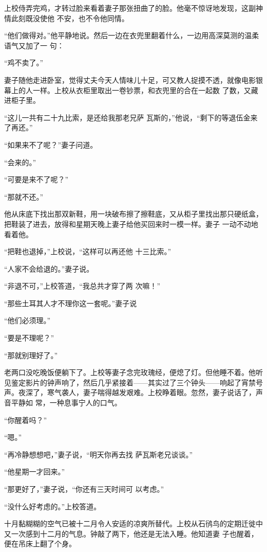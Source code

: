\documentclass{article}
\begin{document}
上校侍弄完鸡，才转过脸来看着妻子那张扭曲了的脸。他毫不惊讶地发现，这副神情此刻既没使他
不安，也不令他同情。 

“他们做得对。”他平静地说。然后一边在衣兜里翻着什么，一边用高深莫测的温柔语气又加了一
句： 


“鸡不卖了。” 

妻子随他走进卧室，觉得丈夫今天人情味儿十足，可又教人捉摸不透，就像电影银幕上的人一样。上校从衣柜里取出一卷钞票，和衣兜里的合在一起数
了数，又藏进柜子里。 

\newpage

“这儿一共有二十九比索，是还给我那老兄萨
瓦斯的，”他说，“剩下的等退伍金来了再还。” 


“如果来不了呢？”妻子问道。 


“会来的。” 


“可要是来不了呢？” 


“那就不还。” 

他从床底下找出那双新鞋，用一块破布擦了擦鞋底，又从柜子里找出那只硬纸盒，把鞋装了进去，放得和星期天晚上妻子给他买回来时一模一样。妻子
一动不动地看着他。 

“把鞋也退掉，”上校说，“这样可以再还他
十三比索。” 


“人家不会给退的。”妻子说。 

\newpage

“非退不可，”上校答道，“我总共才穿了两
次嘛！” 

“那些土耳其人才不理你这一套呢。”妻子说


“他们必须理。” 


“要是不理呢？” 


“那就别理好了。” 

老两口没吃晚饭便躺下了。上校等妻子念完玫瑰经，便熄了灯。但他睡不着。他听见鉴定影片的钟声响了，然后几乎紧接着——其实过了三个钟头——响起了宵禁号声。夜深了，寒气袭人，妻子喘得越发艰难。上校睁着眼。忽然，妻子说话了，声音平静如
常，一种息事宁人的口气。 


“你醒着吗？” 


\newpage

“嗯。” 

“再冷静想想吧，”妻子说，“明天你再去找
萨瓦斯老兄谈谈。” 


“他星期一才回来。” 

“那更好了，”妻子说，“你还有三天时间可
以考虑。” 


“没什么好考虑的。”上校答道。 

十月黏糊糊的空气已被十二月令人安适的凉爽所替代。上校从石鸻鸟的定期迁徙中又一次感到十二月的气息。钟敲了两下，他还是无法入睡。他知道妻
子也醒着，便在吊床上翻了个身。 
\end{document}
